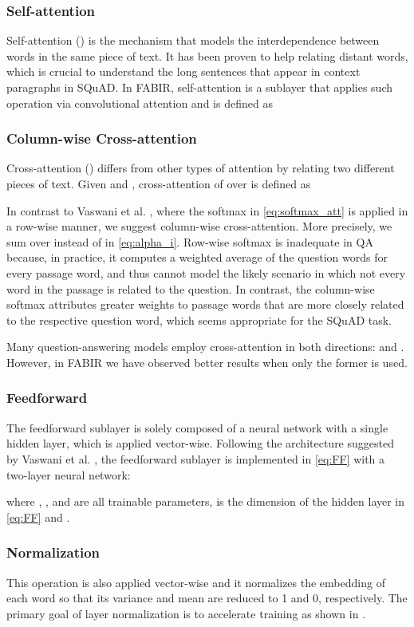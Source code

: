 \documentclass[conference, letterpaper, 10pt]{IEEEtran}
\begin{document}
\subsubsection{Self-attention}
Self-attention () is the mechanism that models the interdependence between words in the same piece of text. 
It has been proven to help relating distant words, which is crucial to understand the long sentences that appear in context paragraphs in SQuAD.
In FABIR, self-attention is a sublayer that applies such operation via convolutional attention and is defined as

\subsubsection{Column-wise Cross-attention}
Cross-attention () differs from other types of attention by relating two different pieces of text.
Given  and , cross-attention of  over  is defined as


In contrast to Vaswani et al. \cite{Vaswani}, where  the softmax in \eqref{eq:softmax_att} is applied in a row-wise manner, we suggest column-wise cross-attention. More precisely, we sum over  instead of  in \eqref{eq:alpha_i}. 
Row-wise softmax is inadequate in QA because, in practice, it computes a weighted average of the question words for every passage word, and thus cannot model the likely scenario in which not every word in the passage is related to the question. In contrast, the column-wise softmax attributes greater weights to passage words that are more closely related to the respective question word, which seems appropriate for the SQuAD task.

Many question-answering models employ cross-attention in both directions:  and  \cite{Yang2017,Xiong2016,Seo2016}. However, in FABIR we have observed better results when only the former is used.

\subsubsection{Feedforward}
The feedforward sublayer is solely composed of a neural network with a single hidden layer, which is applied vector-wise.
Following the architecture suggested by Vaswani et al. \cite{Vaswani}, the feedforward sublayer is implemented in \eqref{eq:FF} with a two-layer neural network:

where , ,  and  are all trainable parameters,  is the dimension of the hidden layer in \eqref{eq:FF} and .

\subsubsection{Normalization}
This operation is also applied vector-wise and it normalizes the embedding of each word so that its variance and mean are reduced to 1 and 0, respectively.
The primary goal of layer normalization is to accelerate training as shown in \cite{IoffeS15,Hinton16}. 
\end{document}
